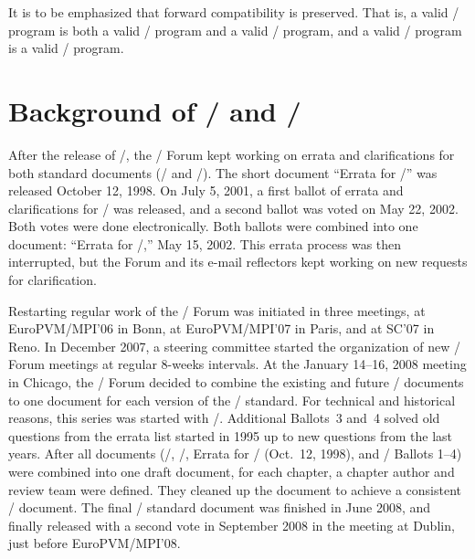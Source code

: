 It is to be emphasized that forward compatibility is preserved.  That is,
a valid \mpiidoti/ program is both a valid
\mpiidotiii/
program and a valid
\mpiiidoti/
program, and a valid
\mpiidotiii/
program is a valid
\mpiiidoti/
program.



\section{Background of \texorpdfstring{\MPIIDOTIII/}{MPI-1.3} and \texorpdfstring{\MPIIIDOTI/}{MPI-2.1}}
\label{sec:background:ii:i}
After the release of \MPIIIDOTO/, the \MPI/ Forum kept working on
errata and clarifications for both standard documents (\MPIIDOTI/ and \MPIIIDOTO/).
The short document ``Errata for \MPIIDOTI/'' was released October 12, 1998.
On
July 5, 2001, a first ballot of errata and clarifications for \MPIIIDOTO/
was released, and a second ballot was voted on May 22, 2002.
Both votes were done
electronically.
Both ballots were combined into one document:
``Errata
for \MPIII/,'' May
15, 2002.
This errata process was then interrupted, but the
Forum and its e-mail reflectors kept working
on new requests for clarification.

Restarting regular work of the \MPI/ Forum was initiated in
three meetings,
at EuroPVM/MPI'06 in Bonn, at EuroPVM/MPI'07 in Paris, and
at SC'07 in Reno.
In December 2007,
a steering committee started the
organization of new \MPI/ Forum meetings at regular 8-weeks intervals.
At the January 14--16, 2008
meeting in Chicago, the \MPI/ Forum decided to combine
the existing and future \MPI/ documents to one document for
each version of the \MPI/ standard.
For technical and historical reasons, this series was started with \MPIIDOTIII/.
Additional Ballots~3 and~4
solved
old questions from the
errata list started in 1995
up to
new questions from the last years.
After all documents (\MPIIDOTI/, \MPIII/, Errata for \MPIIDOTI/ (Oct.~12, 1998),
and \MPIIIDOTI/ Ballots 1--4) were combined into one draft document,
for each chapter, a chapter author and review team were defined.
They cleaned up the document to achieve a consistent \MPIIIDOTI/ document.
The
final \MPIIIDOTI/ standard document
was
finished in June 2008, and finally released with a second vote
in September 2008 in the meeting at Dublin,
just
before EuroPVM/MPI'08.

